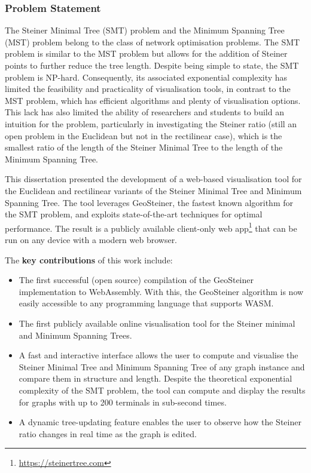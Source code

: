 \documentclass{l4proj}
\begin{document}
\subsubsection{Problem Statement}
The Steiner Minimal Tree (SMT) problem and the Minimum Spanning Tree (MST) problem belong to the class of network optimisation problems. The SMT problem is similar to the MST problem but allows for the addition of Steiner points to further reduce the tree length.
Despite being simple to state, the SMT problem is NP-hard. Consequently, its associated exponential complexity has limited the feasibility and practicality of visualisation tools, in contrast to the MST problem, which has efficient algorithms and plenty of visualisation options. This lack has also limited the ability of researchers and students to build an intuition for the problem, particularly in investigating the Steiner ratio (still an open problem in the Euclidean but not in the rectilinear case), which is the smallest ratio of the length of the Steiner Minimal Tree to the length of the Minimum Spanning Tree.

This dissertation presented the development of a web-based visualisation tool for the Euclidean and rectilinear variants of the Steiner Minimal Tree and Minimum Spanning Tree. The tool leverages GeoSteiner, the fastest known algorithm for the SMT problem, and exploits state-of-the-art techniques for optimal performance.
The result is a publicly available client-only web app\footnote{\url{https://steinertree.com}} that can be run on any device with a modern web browser.

The \textbf{key contributions} of this work include:
\begin{itemize}
    \item The first successful (open source) compilation of the GeoSteiner implementation to WebAssembly. With this, the GeoSteiner algorithm is now easily accessible to any programming language that supports WASM.
    \item The first publicly available online visualisation tool for the Steiner minimal and Minimum Spanning Trees.
    \item A fast and interactive interface allows the user to compute and visualise the Steiner Minimal Tree and Minimum Spanning Tree of any graph instance and compare them in structure and length. Despite the theoretical exponential complexity of the SMT problem, the tool can compute and display the results for graphs with up to 200 terminals in sub-second times.
    \item A dynamic tree-updating feature enables the user to observe how the Steiner ratio changes in real time as the graph is edited.
\end{itemize}
\end{document}
